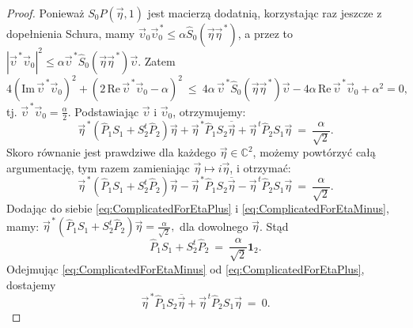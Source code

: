 \begin{proof}
Ponieważ $S_{0} P(\vec{\eta},1)$ jest macierzą dodatnią,
korzystając raz jeszcze z dopełnienia Schura, mamy
$\vec{\upsilon}_{0} \vec{\upsilon}_{0}^{\,*} \leq  \alpha \hat{S}_{0}(\vec{\eta} \vec{\eta}^{\,*})$,
a przez to
$|\vec{\upsilon}^{\,*} \vec{\upsilon}_{0}|^{2} \leq
  \alpha \vec{\upsilon}^{\,*} \hat{S}_{0}(\vec{\eta} \vec{\eta}^{\,*}) \vec{\upsilon}$.
Zatem
\begin{equation}
4 \left( \text{Im} \, \vec{\upsilon}^{\,*} \vec{\upsilon}_{0} \right)^{2} +
\left( 2 \, \text{Re} \, \vec{\upsilon}^{\,*} \vec{\upsilon}_{0} - \alpha \right)^{2}
 \: \leq \:
4 \alpha \, \vec{\upsilon}^{\,*} \hat{S}_{0}(\vec{\eta} \vec{\eta}^{\,*}) \vec{\upsilon}
    - 4 \alpha \, \text{Re} \, \vec{\upsilon}^{\,*} \vec{\upsilon}_{0} + \alpha^{2}  = 0,
\end{equation}
tj. $\vec{\upsilon}^{\,*} \vec{\upsilon}_{0} = \frac{\alpha}{2}$.
Podstawiając $\vec{\upsilon}$ i $\vec{\upsilon}_{0}$,
otrzymujemy:
\begin{equation}
\label{eq:ComplicatedForEtaPlus}
\vec{\eta}^{\,*} \left( \hat{P}_{1} S_{1} + S_{2}^{t} \hat{P}_{2} \right) \vec{\eta}
    + \vec{\eta}^{\,*} \hat{P}_{1} S_{2} \overline{\vec{\eta}}
    + \vec{\eta}^{\,t} \hat{P}_{2} S_{1} \vec{\eta} \: = \: \frac{\alpha}{\sqrt{2}}.
\end{equation}
Skoro równanie jest prawdziwe dla każdego  $\vec{\eta} \in \mathbb{C}^{2}$,
możemy powtórzyć całą argumentację, tym razem zamieniając
$\vec{\eta} \mapsto i \vec{\eta}$,
i otrzymać:
\begin{equation}
\label{eq:ComplicatedForEtaMinus}
\vec{\eta}^{\,*} \left( \hat{P}_{1} S_{1} + S_{2}^{t} \hat{P}_{2} \right) \vec{\eta}
    - \vec{\eta}^{\,*} \hat{P}_{1} S_{2} \overline{\vec{\eta}}
    - \vec{\eta}^{\,t} \hat{P}_{2} S_{1} \vec{\eta} \: = \: \frac{\alpha}{\sqrt{2}}.
\end{equation}
Dodając do siebie
\eqref{eq:ComplicatedForEtaPlus} i \eqref{eq:ComplicatedForEtaMinus},
mamy:
$
\vec{\eta}^{\,*} \left( \hat{P}_{1} S_{1} + S_{2}^{t} \hat{P}_{2} \right) \vec{\eta} =
    \frac{\alpha}{\sqrt{2}},
$
dla dowolnego $\vec{\eta}$.
Stąd
\begin{equation}
\label{eq:S1PlusS2EqualsOne}
\hat{P}_{1} S_{1} + S_{2}^{t} \hat{P}_{2} \: = \:
     \frac{\alpha}{\sqrt{2}} \mathbf{1}_{2}.
\end{equation}
Odejmując \eqref{eq:ComplicatedForEtaMinus} od
\eqref{eq:ComplicatedForEtaPlus},
dostajemy
\begin{equation}
    \vec{\eta}^{\,*} \hat{P}_{1} S_{2} \overline{\vec{\eta}}
    + \vec{\eta}^{\,t} \hat{P}_{2} S_{1} \vec{\eta} \: = \: 0.

\end{equation}
\end{proof}
